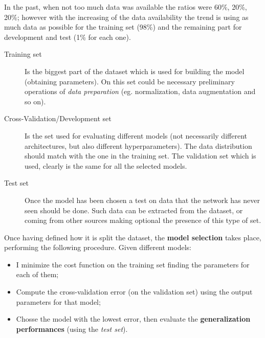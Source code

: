 In the past, when not too much data was available the ratios were 60\%, 20\%, 20\%; however with the increasing of the data availability the trend is using as much data as possible for the training set (98\%) and the remaining part for development and test (1\% for each one).
 \begin{description}
    \item[Training set] Is the biggest part of the dataset which is used for building the model (obtaining parameters). On this set could be necessary preliminary operations of \textit{data preparation} (eg. normalization, data augmentation and so on).
    \item[Cross-Validation/Development set] Is the set used for evaluating different models (not necessarily different architectures, but also different hyperparameters). The data distribution should match with the one in the training set. The validation set which is used, clearly is the same for all the selected models.
    \item[Test set] Once the model has been chosen a test on data that the network has never seen should be done. Such data can be extracted from the dataset, or coming from other sources making optional the presence of this type of set.
\end{description}

Once having defined how it is split the dataset, the \textbf{model selection} takes place, performing the following procedure. Given different models:
\begin{itemize}
    \item I minimize the cost function on the training set finding the parameters for each of them; 
    \item Compute the cross-validation error (on the validation set) using the output parameters for that model; 
    \item Chosse the model with the lowest error, then evaluate the \textbf{generalization performances} (using the \textit{test set}).
\end{itemize}
